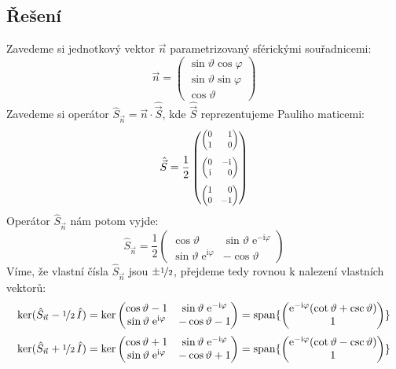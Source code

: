 \documentclass[10pt,a4paper]{article}
\def\ph{\phantom}
\newcommand{\const}[1]{\text{#1}}
\newcommand{\mat}[1]{
    \begin{pmatrix}
        #1
    \end{pmatrix}
}
\newcommand{\smat}[2][1]{
    \scalebox{#1}{$\mat{#2}$}
}
\newcommand{\e}[1]{\const{e}^{#1}}
\renewcommand{\i}{\const{i}}
\begin{document}
\subsection{Řešení}
Zavedeme si jednotkový vektor $\vec n$ parametrizovaný sférickými souřadnicemi:
\begin{equation*}
    \vec n = \mat{
        \sin \vartheta \cos \varphi \\
        \sin \vartheta \sin \varphi \\
        \cos \vartheta
    }
\end{equation*}
Zavedeme si operátor $\hat S_{\vec n} = \vec n \cdot \hat{\vec S}$, kde $\hat{\vec S}$ reprezentujeme Pauliho maticemi:
\begin{equation*}
    \hat{\vec S} = \frac{1}{2} \mat{
        \smat[0.8]{0 & \ph{-} 1 \\ 1 & \ph{-} 0} \\[10pt]
        \smat[0.8]{0 & -\i \\ \i & \ph{-} 0} \\[10pt]
        \smat[0.8]{1 & \ph{-} 0 \\ 0 & -1}
    }
\end{equation*}
Operátor $\hat S_{\vec n}$ nám potom vyjde:
\begin{equation*}
    \hat S_{\vec n} = \frac{1}{2} \mat{
        \cos \vartheta & \sin \vartheta \; \e{-\i \varphi} \\
        \sin \vartheta \; \e{\i \varphi} & -\cos \vartheta
    }
\end{equation*}
Víme, že vlastní čísla $\hat S_{\vec n}$ jsou $\pm \nicefrac{1}{2}$, přejdeme tedy rovnou k nalezení vlastních vektorů:
\begin{equation*}
    \ker(\hat S_{\vec n} - \nicefrac{1}{2} \, \hat I)
    = \ker\mat{
        \cos \vartheta - 1 & \sin \vartheta \; \e{-\i \varphi} \\
        \sin \vartheta \; \e{\i \varphi} & -\cos \vartheta - 1
    }
    = \operatorname{span} \{ \mat{
        \e{-\i \varphi} (\cot \vartheta + \csc \vartheta) \\ 1
    } \}
\end{equation*}
\begin{equation*}
    \ker(\hat S_{\vec n} + \nicefrac{1}{2} \, \hat I)
    = \ker\mat{
        \cos \vartheta + 1 & \sin \vartheta \; \e{-\i \varphi} \\
        \sin \vartheta \; \e{\i \varphi} & -\cos \vartheta + 1
    }
    = \operatorname{span} \{ \mat{
        \e{-\i \varphi} (\cot \vartheta - \csc \vartheta) \\ 1
    } \}
\end{equation*}
\end{document}
